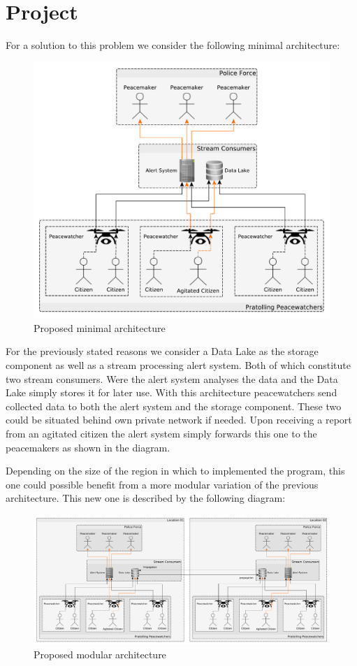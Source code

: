 \documentclass[11pt]{article}
\begin{document}
\section{Project}
For a solution to this problem we consider the following minimal architecture:\\
\begin{figure}[H]
  \centering
  \includegraphics[scale=0.4]{image/minimal.pdf}
  \caption{Proposed minimal architecture}
\end{figure}
For the previously stated reasons we consider a Data Lake as the storage
component as well as a stream processing alert system. Both of which constitute
two stream consumers. Were the alert system analyses the data and the Data Lake
simply stores it for later use. With this architecture peacewatchers send
collected data to both the alert system and the storage component. These two
could be situated behind own private network if needed. Upon receiving a report
from an agitated citizen the alert system simply forwards this one to the
peacemakers as shown in the diagram.\par Depending on the size of the region in
which to implemented the program, this one could possible benefit from a more
modular variation of the previous architecture. This new one is described by the
following diagram:
\begin{figure}[H]
  \centering
  \includegraphics[scale=0.3]{image/multiple.pdf}
  \caption{Proposed modular architecture}
\end{figure}
\end{document}
